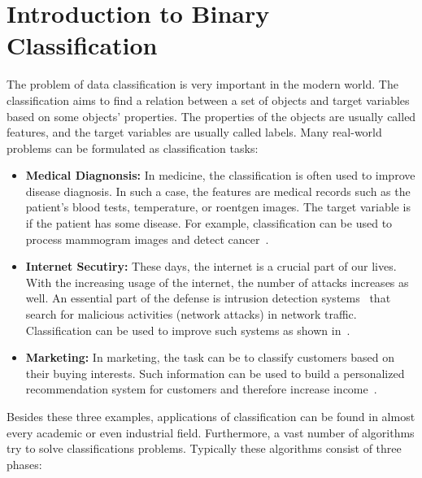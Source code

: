 \chapter{Introduction to Binary Classification}

The problem of data classification is very important in the modern world. The classification aims to find a relation between a set of objects and target variables based on some objects' properties. The properties of the objects are usually called features, and the target variables are usually called labels. Many real-world problems can be formulated as classification tasks:
\begin{itemize}
  \item \textbf{Medical Diagnonsis:} In medicine, the classification is often used to improve disease diagnosis. In such a case, the features are medical records such as the patient's blood tests, temperature, or roentgen images. The target variable is if the patient has some disease. For example, classification can be used to process mammogram images and detect cancer~\cite{viale2012current, levy2016breast}.
  \item \textbf{Internet Secutiry:} These days, the internet is a crucial part of our lives. With the increasing usage of the internet, the number of attacks increases as well. An essential part of the defense is intrusion detection systems~\cite{grill2016learning, scarfone2007guide} that search for malicious activities (network attacks) in network traffic. Classification can be used to improve such systems as shown in~\cite{giacinto2002intrusion, shanbhag2009accurate}.
  \item \textbf{Marketing:} In marketing, the task can be to classify customers based on their buying interests. Such information can be used to build a personalized recommendation system for customers and therefore increase income~\cite{kaefer2005neural, zhang2007building}.
\end{itemize}
Besides these three examples, applications of classification can be found in almost every academic or even industrial field. Furthermore, a vast number of algorithms try to solve classifications problems. Typically these algorithms consist of three phases:
